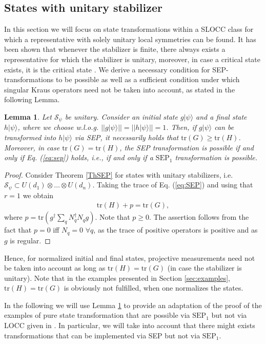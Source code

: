 \documentclass[superscriptaddress,twocolumn]{revtex4}\usepackage[utf8]{inputenc}
\newtheorem{lemma}[theorem]{Lemma}
\newcommand{\tr}{\text{tr}}
\newcommand{\ket}[1]{|#1\rangle}
\newcommand{\bea}{\begin{eqnarray}}
\newcommand{\eea}{\end{eqnarray}}
\begin{document}
\subsection{States with unitary stabilizer}
In this section we will focus on state transformations within a SLOCC class for which a representative with solely unitary local symmetries can be found. It has been shown that whenever the stabilizer is finite, there always exists a representative for which the stabilizer is unitary, moreover, in case a critical state exists, it is the critical state \cite[Propositions 5 and 6]{GoWa11}.
We derive a necessary condition for SEP-transformations to be possible as well as a sufficient condition under which singular Kraus operators need not be taken into account, as stated in the following Lemma.

\begin{lemma}
\label{Lemma:unitary} Let $\mathcal{S}_\psi$ be unitary.
Consider an initial state $g \ket{\psi}$ and a final state $h \ket{\psi}$, where we choose w.l.o.g. $||g \ket{\psi}|| = ||h \ket{\psi}||=1$.
Then, if $g \ket{\psi}$ can be transformed into $h \ket{\psi}$ via SEP, it necessarily holds that $\tr (G)\geq \tr (H)$. Moreover, in case $\tr (G)= \tr (H)$, the SEP transformation is possible if and only if Eq. (\ref{eq:sep}) holds, i.e., if and only if a $\textrm{SEP}_1$ transformation is possible.

\end{lemma}
\begin{proof}
Consider Theorem \ref{ThSEP} for states with unitary stabilizers, i.e. $\mathcal{S}_\psi \subset U(d_1)\otimes \ldots \otimes U(d_n)$.
Taking the trace of Eq. (\ref{eq:SEP}) and using that $r=1$ we obtain
\bea  \tr(H) +p=\tr( G),\eea where $p=\tr( g^\dagger \sum_q N_q^\dagger N_q g)$. Note that $p\geq 0$. The assertion follows from the fact that $p=0$ iff $N_q=0$ $\forall q$, as the trace of positive operators is positive and as $g$ is regular.
\end{proof}

Hence, for normalized initial and final states, projective measurements need not be taken into account as long as $\tr(H)=\tr(G)$ (in case the stabilizer is unitary). Note that in the examples presented in Section \ref{sec:examples}, $\tr(H)=\tr(G)$ is obviously not fulfilled, when one normalizes the states.


In the following we will use Lemma \ref{Lemma:unitary} to provide an adaptation of the proof of the examples of pure state transformation that are possible via $\textrm{SEP}_1$ but not via LOCC given in \cite{HeSp16}.  In particular, we will take into account that there might exists  transformations that can be implemented via SEP but not via $\textrm{SEP}_1$.
\end{document}
